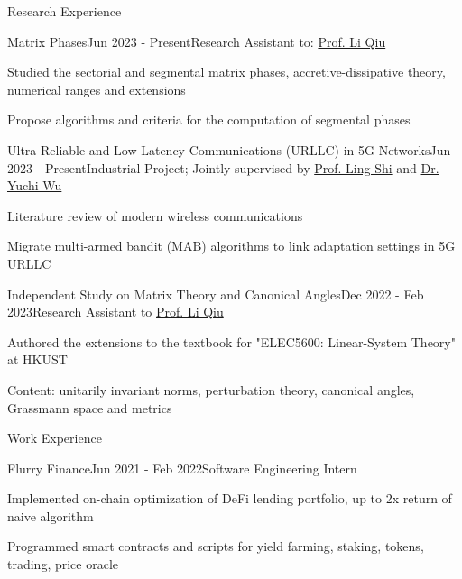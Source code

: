 \documentclass{resume}
\begin{document}
\begin{rSection}{Research Experience}

    \begin{rSubsection}{Matrix Phases}{Jun 2023 - Present}{Research Assistant to: \href{https://eeqiu.people.ust.hk/}{Prof. Li Qiu}}{}
        \item Studied the sectorial and segmental matrix phases, accretive-dissipative theory, numerical ranges and extensions
        \item Propose algorithms and criteria for the computation of segmental phases
    \end{rSubsection}

    \begin{rSubsection}{Ultra-Reliable and Low Latency Communications (URLLC) in 5G Networks}{Jun 2023 - Present}{Industrial Project; Jointly supervised by \href{https://eesling.home.ece.ust.hk/}{Prof. Ling Shi} and \href{https://ieeexplore.ieee.org/author/37086153473}{Dr. Yuchi Wu}}{}
        \item Literature review of modern wireless communications
        \item Migrate multi-armed bandit (MAB) algorithms to link adaptation settings in 5G URLLC
    \end{rSubsection}

    \begin{rSubsection}{Independent Study on Matrix Theory and Canonical Angles}{Dec 2022 - Feb 2023}{Research Assistant to \href{https://eeqiu.people.ust.hk/}{Prof. Li Qiu}}{}
        \item Authored the extensions to the textbook for "ELEC5600: Linear-System Theory" at HKUST
        \item Content: unitarily invariant norms, perturbation theory, canonical angles, Grassmann space and metrics
    \end{rSubsection}

\end{rSection}

\begin{rSection}{Work Experience}

    \begin{rSubsection}{Flurry Finance}{Jun 2021 - Feb 2022}{Software Engineering Intern}{}
        \item Implemented on-chain optimization of DeFi lending portfolio, up to 2x return of naive algorithm
        \item Programmed smart contracts and scripts for yield farming, staking, tokens, trading, price oracle
    \end{rSubsection}

\end{rSection}
\end{document}
